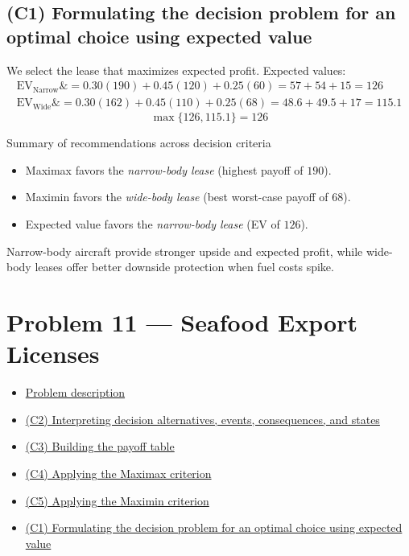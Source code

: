 \documentclass[11pt]{article}
\begin{document}
	\subsection*{(C1) Formulating the decision problem for an optimal choice using expected value}
	
	\hypertarget{problem10-c1}{}
	
	We select the lease that maximizes expected profit. Expected values:
	\[
	\begin{aligned}
		\mathrm{EV}_{\text{Narrow}} \&= 0.30(190) + 0.45(120) + 0.25(60) = 57 + 54 + 15 = 126 \\
		\mathrm{EV}_{\text{Wide}} \&= 0.30(162) + 0.45(110) + 0.25(68) = 48.6 + 49.5 + 17 = 115.1
	\end{aligned}
	\]
	\[
	\max\{126, 115.1\} = 126
	\]
	
	Summary of recommendations across decision criteria
	\begin{itemize}
		\item Maximax favors the \emph{narrow-body lease} (highest payoff of $190$).
		\item Maximin favors the \emph{wide-body lease} (best worst-case payoff of $68$).
		\item Expected value favors the \emph{narrow-body lease} (EV of $126$).
	\end{itemize}
	
	Narrow-body aircraft provide stronger upside and expected profit, while wide-body leases offer better downside
	protection when fuel costs spike.
	
	\section*{Problem 11 — Seafood Export Licenses}
	
	\hypertarget{problem11}{}
	
	\hypertarget{problem11-criteria}{}
	
	
	\begin{itemize}
		\item \hyperlink{problem11-problem}{Problem description}
		\item \hyperlink{problem11-c2}{(C2) Interpreting decision alternatives, events, consequences, and states}
		\item \hyperlink{problem11-c3}{(C3) Building the payoff table}
		\item \hyperlink{problem11-c4}{(C4) Applying the Maximax criterion}
		\item \hyperlink{problem11-c5}{(C5) Applying the Maximin criterion}
		\item \hyperlink{problem11-c1}{(C1) Formulating the decision problem for an optimal choice using expected value}
	\end{itemize}
	
\end{document}
